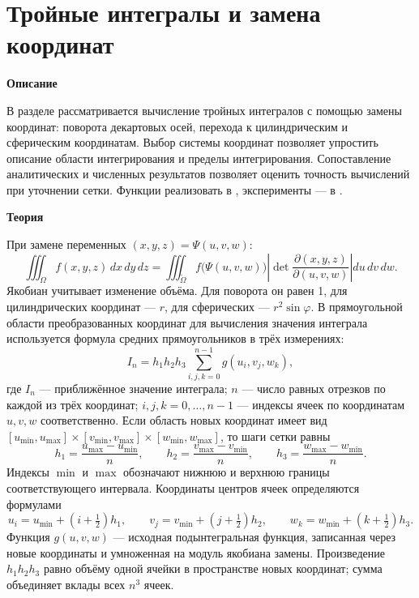 \documentclass[12pt,a4paper]{article}
\newcommand{\taskhead}[1]{\par\textbf{#1}\par}
\begin{document}
\section{Тройные интегралы и замена координат}
\taskhead{Описание}
В разделе рассматривается вычисление тройных интегралов с помощью замены
координат: поворота декартовых осей, перехода к цилиндрическим и сферическим
координатам. Выбор системы координат позволяет упростить описание области
интегрирования и пределы интегрирования. Сопоставление аналитических и численных
результатов позволяет оценить точность вычислений при уточнении сетки.
Функции реализовать в , эксперименты --- в .
\taskhead{Теория}
При замене переменных $(x,y,z)=\Psi(u,v,w)$:
\[
\iiint_\Omega f(x,y,z)\,dx\,dy\,dz
=\iiint_{\widetilde\Omega}f\bigl(\Psi(u,v,w)\bigr)
\left|\det\frac{\partial(x,y,z)}{\partial(u,v,w)}\right|du\,dv\,dw.
\]
Якобиан учитывает изменение объёма. Для поворота он равен 1,
для цилиндрических координат --- $r$, для сферических --- $r^2\sin\varphi$.
В прямоугольной области преобразованных координат для вычисления значения интеграла используется формула
средних прямоугольников в трёх измерениях:
\[
I_n=h_1h_2h_3\sum_{i,j,k=0}^{n-1}g(u_i,v_j,w_k),
\]
где $I_n$ --- приближённое значение интеграла; $n$ --- число равных отрезков
по каждой из трёх координат; $i,j,k=0,\ldots,n-1$ --- индексы ячеек
по координатам $u,v,w$ соответственно.
Если область новых координат имеет вид
$[u_{\min},u_{\max}]\times[v_{\min},v_{\max}]\times[w_{\min},w_{\max}]$,
то шаги сетки равны
\[
h_1=\frac{u_{\max}-u_{\min}}{n},\qquad
h_2=\frac{v_{\max}-v_{\min}}{n},\qquad
h_3=\frac{w_{\max}-w_{\min}}{n}.
\]
Индексы $\min$ и $\max$ обозначают нижнюю и верхнюю границы соответствующего
интервала. Координаты центров ячеек определяются формулами
\[
u_i=u_{\min}+(i+\tfrac12)h_1,\qquad
v_j=v_{\min}+(j+\tfrac12)h_2,\qquad
w_k=w_{\min}+(k+\tfrac12)h_3.
\]
Функция $g(u,v,w)$ --- исходная подынтегральная функция, записанная через
новые координаты и умноженная на модуль якобиана замены.
Произведение $h_1h_2h_3$ равно объёму одной ячейки в пространстве новых
координат; сумма объединяет вклады всех $n^3$ ячеек.
\end{document}
